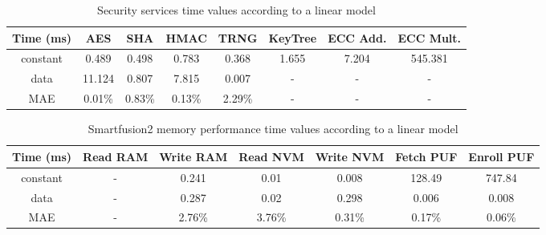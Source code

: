 \begin{table}[h!]
\centering
\def\arraystretch{1.5}
\begin{tabular}{|c|c|c|c|c|c|c|c|}
\hline
	Time (ms)   & AES     & SHA    & HMAC   & TRNG  & KeyTree & ECC Add. & ECC Mult.   \\ \hline
	constant  & 0.489  & 0.498  & 0.783  &  0.368  & 1.655   & 7.204   & 545.381 \\ \hline
	data  & 11.124  & 0.807 & 7.815 & 0.007   & -       & -       & -      \\ \hline
	MAE 	   & 0.01\%  & 0.83\%  & 0.13\% & 2.29\%  & -	  & -	    & -   \\ \hline
\end{tabular}
\caption{Security services time values according to a linear model}
\label{tab:core-model}
\end{table}

\begin{table}[h!]
\centering
\def\arraystretch{1.5}
\begin{tabular}{|c|c|c|c|c|c|c|}
\hline
	Time (ms)   & Read RAM & Write RAM & Read NVM & Write NVM  & Fetch PUF & Enroll PUF \\ \hline
	constant  & -  & 0.241  & 0.01   & 0.008  & 128.49 & 747.84  \\ \hline
	data      & -  & 0.287  & 0.02   & 0.298  & 0.006  & 0.008  \\ \hline
	MAE       & -  & 2.76\% & 3.76\% & 0.31\% & 0.17\% & 0.06\%  \\ \hline
\end{tabular}
\caption{Smartfusion2 memory performance time values according to a linear model}
\label{tab:core-model}
\end{table}
